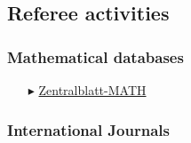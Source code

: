 \separator
\subsection{Referee activities}

\subsubsection{Mathematical databases}

\begin{itemize}

  \item[$\blacktriangleright$] \href{https://zbmath.org/}{Zentralblatt-MATH}

\end{itemize}

\separator
\subsubsection{International Journals}

